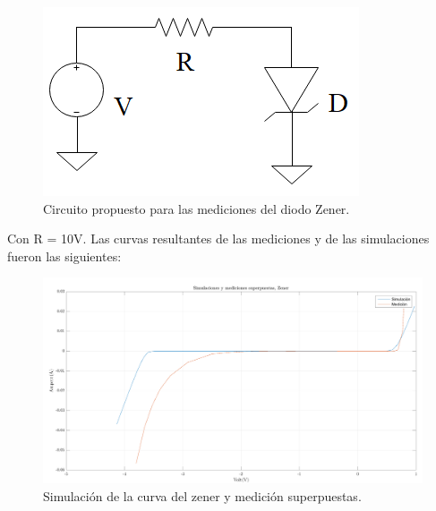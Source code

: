 \documentclass[../../e1_tp1_main.tex]{subfiles}
\begin{document}
	\begin{figure}[H]	%
		\centering
		\includegraphics[scale=1.2]{imagenes/circuito_zener.png}
		\caption{Circuito propuesto para las mediciones del diodo Zener.}
		\label{fig:ej5_circuito_zener}
	\end{figure}

	Con R = 10V.
	Las curvas resultantes de las mediciones y de las simulaciones fueron las siguientes:
	 
\begin{figure}[H]	%
	\centering
	\includegraphics[scale=0.2]{imagenes/zener_simulacion_medicion.png}
	\caption{Simulación de la curva del zener y medición superpuestas.}
	\label{fig:ej5_zener_simulacion_medicion}
\end{figure}
	
\end{document}
